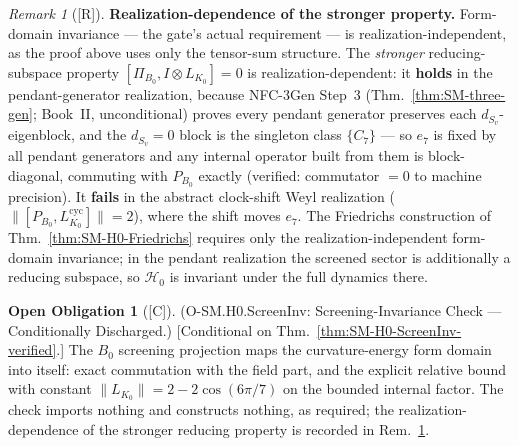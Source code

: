 \documentclass[12pt,oneside]{amsbook}
\theoremstyle{plain}
\theoremstyle{definition}
\newtheorem{obligation}[theorem]{Open Obligation}
\theoremstyle{remark}
\newtheorem{remark}[theorem]{Remark}
\newcommand{\status}[1]{\textup{[#1]}}
\begin{document}
\begin{remark}[\status{R}]\label{rem:SM-H0-realization}
\textbf{Realization-dependence of the stronger property.}
Form-domain invariance --- the gate's actual requirement --- is
realization-independent, as the proof above uses only the
tensor-sum structure.  The \emph{stronger} reducing-subspace
property $[\Pi_{B_0}, I \otimes L_{K_0}] = 0$ is
realization-dependent: it \textbf{holds} in the pendant-generator
realization, because NFC-3Gen Step~3 (Thm.~\ref{thm:SM-three-gen};
Book~II, unconditional) proves every pendant generator preserves
each $d_{S_v}$-eigenblock, and the $d_{S_v}=0$ block is the
singleton class $\{C_7\}$ --- so $e_7$ is fixed by all pendant
generators and any internal operator built from them is
block-diagonal, commuting with $P_{B_0}$ exactly (verified:
commutator $= 0$ to machine precision).  It \textbf{fails} in the
abstract clock-shift Weyl realization
($\|[P_{B_0}, L_{K_0}^{\mathrm{cyc}}]\| = 2$), where the shift
moves $e_7$.  The Friedrichs construction of
Thm.~\ref{thm:SM-H0-Friedrichs} requires only the
realization-independent form-domain invariance; in the pendant
realization the screened sector is additionally a reducing
subspace, so $\mathcal{H}_0$ is invariant under the full dynamics
there.
\end{remark}

\begin{obligation}[\status{C}]\label{ob:SM-H0-ScreenInv}
\textup{(O-SM.H0.ScreenInv: Screening-Invariance Check ---
Conditionally Discharged.)}
\textup{[Conditional on Thm.~\ref{thm:SM-H0-ScreenInv-verified}.]}
The $B_0$ screening projection maps the curvature-energy form
domain into itself: exact commutation with the field part, and the
explicit relative bound with constant $\|L_{K_0}\| =
2-2\cos(6\pi/7)$ on the bounded internal factor.  The check
imports nothing and constructs nothing, as required; the
realization-dependence of the stronger reducing property is
recorded in Rem.~\ref{rem:SM-H0-realization}.
\end{obligation}
\end{document}
